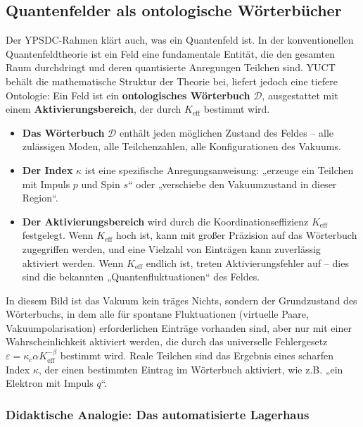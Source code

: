 \documentclass[12pt,a4paper]{article}
\theoremstyle{remark}
\begin{document}
	\subsection{Quantenfelder als ontologische Wörterbücher}
	
	Der YPSDC-Rahmen klärt auch, was ein Quantenfeld ist. In der konventionellen Quantenfeldtheorie ist ein Feld eine fundamentale Entität, die den gesamten Raum durchdringt und deren quantisierte Anregungen Teilchen sind. YUCT behält die mathematische Struktur der Theorie bei, liefert jedoch eine tiefere Ontologie: Ein Feld ist ein \textbf{ontologisches Wörterbuch} $\mathcal{D}$, ausgestattet mit einem \textbf{Aktivierungsbereich}, der durch $K_{\mathrm{eff}}$ bestimmt wird.
	
	\begin{itemize}[leftmargin=*]
		\item \textbf{Das Wörterbuch} $\mathcal{D}$ enthält jeden möglichen Zustand des Feldes – alle zulässigen Moden, alle Teilchenzahlen, alle Konfigurationen des Vakuums.
		\item \textbf{Der Index} $\kappa$ ist eine spezifische Anregungsanweisung: „erzeuge ein Teilchen mit Impuls $p$ und Spin $s$“ oder „verschiebe den Vakuumzustand in dieser Region“.
		\item \textbf{Der Aktivierungsbereich} wird durch die Koordinationseffizienz $K_{\mathrm{eff}}$ festgelegt. Wenn $K_{\mathrm{eff}}$ hoch ist, kann mit großer Präzision auf das Wörterbuch zugegriffen werden, und eine Vielzahl von Einträgen kann zuverlässig aktiviert werden. Wenn $K_{\mathrm{eff}}$ endlich ist, treten Aktivierungsfehler auf – dies sind die bekannten „Quantenfluktuationen“ des Feldes.
	\end{itemize}
	
	In diesem Bild ist das Vakuum kein träges Nichts, sondern der Grundzustand des Wörterbuchs, in dem alle für spontane Fluktuationen (virtuelle Paare, Vakuumpolarisation) erforderlichen Einträge vorhanden sind, aber nur mit einer Wahrscheinlichkeit aktiviert werden, die durch das universelle Fehlergesetz $\varepsilon = \kappa_c \alpha K_{\mathrm{eff}}^{-\beta}$ bestimmt wird. Reale Teilchen sind das Ergebnis eines scharfen Index $\kappa$, der einen bestimmten Eintrag im Wörterbuch aktiviert, wie z.B. „ein Elektron mit Impuls $q$“.
	
	\subsubsection{Didaktische Analogie: Das automatisierte Lagerhaus}
	
\end{document}
